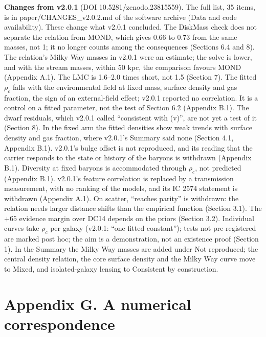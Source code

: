 \documentclass[
  10pt,
]{article}
\begin{document}
\medskip
\noindent\textbf{Changes from v2.0.1} (DOI 10.5281/zenodo.23815559). The full list, 35 items, is in paper/CHANGES\_v2.0.2.md of the software archive (Data and code availability). These change what v2.0.1 concluded. The DiskMass check does not separate the relation from MOND, which gives 0.66 to 0.73 from the same masses, not 1; it no longer counts among the consequences (Sections 6.4 and 8). The relation's Milky Way masses in v2.0.1 were an estimate; the solve is lower, and with the stream masses, within 50 kpc, the comparison favours MOND (Appendix A.1). The LMC is \mbox{1.6--2.0} times short, not 1.5 (Section 7). The fitted $\rho_c$ falls with the environmental field at fixed mass, surface density and gas fraction, the sign of an external-field effect; v2.0.1 reported no correlation. It is a control on a fitted parameter, not the test of Section 6.2 (Appendix B.1). The dwarf residuals, which v2.0.1 called ``consistent with (v)'', are not yet a test of it (Section 8). In the fixed arm the fitted densities show weak trends with surface density and gas fraction, where v2.0.1's Summary said none (Section 4.1, Appendix B.1). v2.0.1's bulge offset is not reproduced, and its reading that the carrier responds to the state or history of the baryons is withdrawn (Appendix B.1). Diversity at fixed baryons is accommodated through $\rho_c$, not predicted (Appendix B.1). v2.0.1's feature correlation is replaced by a transmission measurement, with no ranking of the models, and its IC 2574 statement is withdrawn (Appendix A.1). On scatter, ``reaches parity'' is withdrawn: the relation needs larger distance shifts than the empirical function (Section 3.1). The $+65$ evidence margin over DC14 depends on the priors (Section 3.2). Individual curves take $\rho_c$ per galaxy (v2.0.1: ``one fitted constant''); tests not pre-registered are marked post hoc; the aim is a demonstration, not an existence proof (Section 1). In the Summary the Milky Way masses are added under Not reproduced; the central density relation, the core surface density and the Milky Way curve move to Mixed, and isolated-galaxy lensing to Consistent by construction.

\section{Appendix G. A numerical correspondence}\label{appendix-g}
\end{document}
